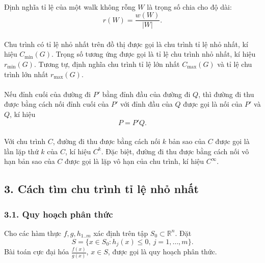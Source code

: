 \documentclass[11pt]{article}
\begin{document}
\paragraph{}
Định nghĩa tỉ lệ của một walk không rỗng \(W\) là trọng số chia cho độ dài:
\[
  r(W)=\frac{w(W)}{|W|}.
\]

\paragraph{}
Chu trình có tỉ lệ nhỏ nhất trên đồ thị được gọi là chu trình tỉ lệ nhỏ nhất,
kí hiệu \(C_{\min}(G)\). Trọng số tương ứng được gọi là tỉ lệ chu trình nhỏ
nhất, kí hiệu \(r_{\min}(G)\). Tương tự, định nghĩa chu trình tỉ lệ lớn nhất
\(C_{\max}(G)\) và tỉ lệ chu trình lớn nhất \(r_{\max}(G)\).

\paragraph{}
Nếu đỉnh cuối của đường đi \(P'\) bằng đỉnh đầu của đường đi \(Q\), thì đường
đi thu được bằng cách nối đỉnh cuối của \(P'\) với đỉnh đầu của \(Q\) được gọi
là nối của \(P'\) và \(Q\), kí hiệu
\[
  P=P'Q.
\]

\paragraph{}
Với chu trình \(C\), đường đi thu được bằng cách nối \(k\) bản sao của \(C\)
được gọi là lần lặp thứ \(k\) của \(C\), kí hiệu \(C^k\). Đặc biệt, đường đi
thu được bằng cách nối vô hạn bản sao của \(C\) được gọi là lặp vô hạn của chu
trình, kí hiệu \(C^\infty\).

\subsection*{3. Cách tìm chu trình tỉ lệ nhỏ nhất}

\subsubsection*{3.1. Quy hoạch phân thức}

Cho các hàm thực \(f,g,h_{1..m}\) xác định trên tập \(S_0\subset \mathbb R^n\).
Đặt
\[
  S=\{x\in S_0:h_j(x)\le0,\ j=1,\ldots,m\}.
\]
Bài toán cực đại hóa \(\frac{f(x)}{g(x)}\), \(x\in S\), được gọi là quy hoạch
phân thức.
\end{document}
